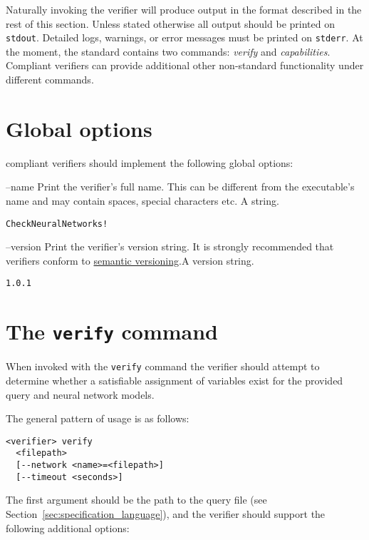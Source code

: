 Naturally invoking the verifier will produce output in the format described in the rest of this section. Unless stated otherwise all output should be printed on \texttt{stdout}. Detailed logs, warnings, or error messages must be printed on \texttt{stderr}.
At the moment, the \vnnlib{} standard contains two commands: \emph{verify} and \emph{capabilities}. Compliant verifiers can provide additional other non-standard functionality under different commands.

\section{Global options}

\vnnlib{} compliant verifiers should implement the following global options:

\clOutputOption
{--name}
{Print the verifier's full name. This can be different from the executable's name and may contain spaces, special characters etc.}
{A string.}
\begin{lstlisting}[style=bash]
%*\exampleVerifier* --name
CheckNeuralNetworks!
\end{lstlisting}

\clOutputOption
{--version}
{Print the verifier's version string. It is strongly recommended that verifiers conform to \href{https://semver.org/}{semantic versioning}.}{A version string.}
\begin{lstlisting}[style=bash]
%*\exampleVerifier* --version
1.0.1
\end{lstlisting}


\section{The \texttt{verify} command}
\label{sec:verify_command}

When invoked with the \texttt{verify} command  the verifier should attempt to determine whether a satisfiable assignment of variables exist for the provided \vnnlib{} query and neural network models.

The general pattern of usage is as follows:
\begin{lstlisting}[style=bash]
<verifier> verify 
  <filepath>
  [--network <name>=<filepath>]
  [--timeout <seconds>]
\end{lstlisting}
The first argument should be the path to the \vnnlib{} query file (see Section~\ref{sec:specification_language}), and the verifier should support the following additional options:

